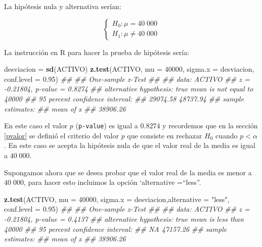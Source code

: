 \documentclass[]{book}
\newenvironment{Shaded}{\begin{snugshade}}{\end{snugshade}}
\newcommand{\CommentTok}[1]{\textcolor[rgb]{0.56,0.35,0.01}{\textit{#1}}}
\newcommand{\DataTypeTok}[1]{\textcolor[rgb]{0.13,0.29,0.53}{#1}}
\newcommand{\DecValTok}[1]{\textcolor[rgb]{0.00,0.00,0.81}{#1}}
\newcommand{\FloatTok}[1]{\textcolor[rgb]{0.00,0.00,0.81}{#1}}
\newcommand{\KeywordTok}[1]{\textcolor[rgb]{0.13,0.29,0.53}{\textbf{#1}}}
\newcommand{\NormalTok}[1]{#1}
\newcommand{\StringTok}[1]{\textcolor[rgb]{0.31,0.60,0.02}{#1}}
\begin{document}
La hipótesis nula y alternativa serían:

\begin{equation} 
\begin{cases} 
H_0: \mu = 40\;000 \\ 
H_1: \mu \neq 40\;000
\end{cases} 
\end{equation}

La instrucción en R para hacer la prueba de hipótesis sería:

\begin{Shaded}
\begin{Highlighting}[]
\NormalTok{desviacion =}\StringTok{ }\KeywordTok{sd}\NormalTok{(ACTIVO)}
\KeywordTok{z.test}\NormalTok{(ACTIVO, }\DataTypeTok{mu =} \DecValTok{40000}\NormalTok{, }\DataTypeTok{sigma.x =}\NormalTok{ desviacion, }\DataTypeTok{conf.level =} \FloatTok{0.95}\NormalTok{)}
\CommentTok{## }
\CommentTok{##  One-sample z-Test}
\CommentTok{## }
\CommentTok{## data:  ACTIVO}
\CommentTok{## z = -0.21804, p-value = 0.8274}
\CommentTok{## alternative hypothesis: true mean is not equal to 40000}
\CommentTok{## 95 percent confidence interval:}
\CommentTok{##  29074.58 48737.94}
\CommentTok{## sample estimates:}
\CommentTok{## mean of x }
\CommentTok{##  38906.26}
\end{Highlighting}
\end{Shaded}

En este caso el valor \(p\) (\texttt{p-value}) es igual a \(0.8274\) y recordemos que en la sección \ref{pvalor} se definió el criterio del valor \(p\) que consiste en rechazar \(H_0\) cuando \(p < \alpha\). En este caso se acepta la hipótesis nula de que el valor real de la media es igual a \(40\;000\).

Supongamos ahora que se desea probar que el valor real de la media es menor a \(40\;000\), para hacer esto incluimos la opción `alternative =``less''.

\begin{Shaded}
\begin{Highlighting}[]
\KeywordTok{z.test}\NormalTok{(ACTIVO, }\DataTypeTok{mu =} \DecValTok{40000}\NormalTok{, }\DataTypeTok{sigma.x =}\NormalTok{ desviacion,}\DataTypeTok{alternative =} \StringTok{"less"}\NormalTok{,  }\DataTypeTok{conf.level =} \FloatTok{0.95}\NormalTok{)}
\CommentTok{## }
\CommentTok{##  One-sample z-Test}
\CommentTok{## }
\CommentTok{## data:  ACTIVO}
\CommentTok{## z = -0.21804, p-value = 0.4137}
\CommentTok{## alternative hypothesis: true mean is less than 40000}
\CommentTok{## 95 percent confidence interval:}
\CommentTok{##        NA 47157.26}
\CommentTok{## sample estimates:}
\CommentTok{## mean of x }
\CommentTok{##  38906.26}
\end{Highlighting}
\end{Shaded}
\end{document}
